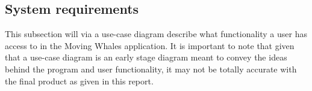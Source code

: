 \subsection{System requirements}

This subsection will via a use-case diagram describe what functionality a 
user has access to in the Moving Whales application. It is important to note
that given that a use-case diagram is an early stage diagram meant to convey the 
ideas behind the program and user functionality, it may not be totally 
accurate with the final product as given in this report.

\clearpage

